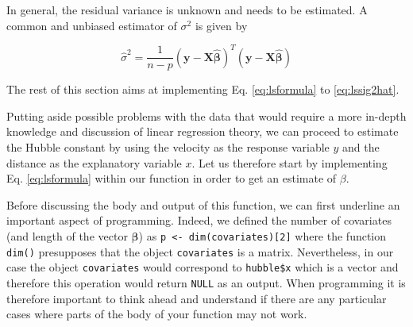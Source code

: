 \documentclass[12pt,]{krantz}
\newenvironment{Shaded}{\begin{snugshade}}{\end{snugshade}}
\newcommand{\KeywordTok}[1]{\textcolor[rgb]{0.27,0.27,0.27}{\textbf{#1}}}
\newcommand{\DecValTok}[1]{\textcolor[rgb]{0.06,0.06,0.06}{#1}}
\newcommand{\StringTok}[1]{\textcolor[rgb]{0.5,0.5,0.5}{#1}}
\newcommand{\CommentTok}[1]{\textcolor[rgb]{0.37,0.37,0.37}{\textit{#1}}}
\newcommand{\ControlFlowTok}[1]{\textcolor[rgb]{0.27,0.27,0.27}{\textbf{#1}}}
\newcommand{\OperatorTok}[1]{\textcolor[rgb]{0.43,0.43,0.43}{\textbf{#1}}}
\newcommand{\NormalTok}[1]{#1}
\let\BeginKnitrBlock\begin \let\EndKnitrBlock\end
\begin{document}
\newline

In general, the residual variance is unknown and needs to be estimated.
A common and unbiased estimator of \(\sigma^2\) is given by

\begin{equation}
  \hat{\sigma}^2 = \frac{1}{n - p}  \left( \mathbf{y} - \mathbf{X}\hat{\boldsymbol{\beta}} \right)^T \left( \mathbf{y} - \mathbf{X} \hat{\boldsymbol{\beta}}\right) 
  \label{eq:lssig2hat}
\end{equation}

The rest of this section aims at implementing Eq. \eqref{eq:lsformula} to
\eqref{eq:lssig2hat}.

Putting aside possible problems with the data that would require a more
in-depth knowledge and discussion of linear regression theory, we can
proceed to estimate the Hubble constant by using the velocity as the
response variable \(y\) and the distance as the explanatory variable
\(x\). Let us therefore start by implementing Eq. \eqref{eq:lsformula}
within our function in order to get an estimate of \(\beta\).

\begin{Shaded}
\end{Shaded}

\BeginKnitrBlock{rmdimportant}
Before discussing the body and output of this function, we can first
underline an important aspect of programming. Indeed, we defined the
number of covariates (and length of the vector \(\boldsymbol{\beta}\))
as \texttt{p\ \textless{}-\ dim(covariates){[}2{]}} where the function
\texttt{dim()} presupposes that the object \texttt{covariates} is a
matrix. Nevertheless, in our case the object \texttt{covariates} would
correspond to \texttt{hubble\$x} which is a vector and therefore this
operation would return \texttt{NULL} as an output. When programming it
is therefore important to think ahead and understand if there are any
particular cases where parts of the body of your function may not work.
\EndKnitrBlock{rmdimportant}
\end{document}

